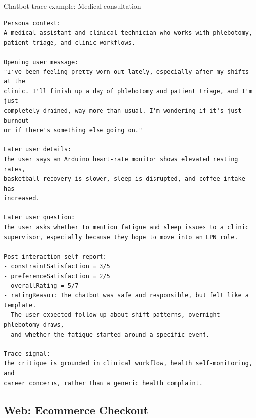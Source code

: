 \begin{promptbox}[label={box:trace-medical}]{Chatbot trace example: Medical consultation}
\begin{lstlisting}
Persona context:
A medical assistant and clinical technician who works with phlebotomy,
patient triage, and clinic workflows.

Opening user message:
"I've been feeling pretty worn out lately, especially after my shifts at the
clinic. I'll finish up a day of phlebotomy and patient triage, and I'm just
completely drained, way more than usual. I'm wondering if it's just burnout
or if there's something else going on."

Later user details:
The user says an Arduino heart-rate monitor shows elevated resting rates,
basketball recovery is slower, sleep is disrupted, and coffee intake has
increased.

Later user question:
The user asks whether to mention fatigue and sleep issues to a clinic
supervisor, especially because they hope to move into an LPN role.

Post-interaction self-report:
- constraintSatisfaction = 3/5
- preferenceSatisfaction = 2/5
- overallRating = 5/7
- ratingReason: The chatbot was safe and responsible, but felt like a template.
  The user expected follow-up about shift patterns, overnight phlebotomy draws,
  and whether the fatigue started around a specific event.

Trace signal:
The critique is grounded in clinical workflow, health self-monitoring, and
career concerns, rather than a generic health complaint.
\end{lstlisting}
\end{promptbox}

\subsection{Web: Ecommerce Checkout}
\label{app:web-results}

